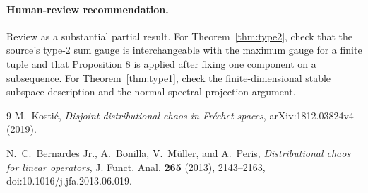 \documentclass[11pt]{article}
\begin{document}
\paragraph{Human-review recommendation.}
Review as a substantial partial result.  For Theorem~\ref{thm:type2}, check
that the source's type-2 sum gauge is interchangeable with the maximum gauge
for a finite tuple and that Proposition 8 is applied after fixing one
component on a subsequence.  For Theorem~\ref{thm:type1}, check the
finite-dimensional stable subspace description and the normal spectral
projection argument.

\begin{thebibliography}{9}
M.~Kosti\'c,
\emph{Disjoint distributional chaos in Fr\'echet spaces},
arXiv:1812.03824v4 (2019).

N.~C.~Bernardes Jr., A.~Bonilla, V.~M\"uller, and A.~Peris,
\emph{Distributional chaos for linear operators},
J. Funct. Anal. \textbf{265} (2013), 2143--2163,
doi:10.1016/j.jfa.2013.06.019.
\end{thebibliography}
\end{document}
